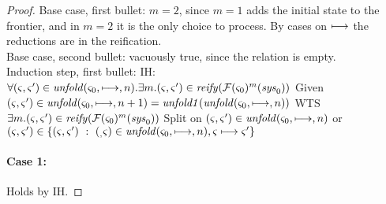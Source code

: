 \begin{proof}
  Base case, first bullet: $m = 2$, since $m = 1$ adds the initial state to the frontier, and in $m = 2$ it is the only choice to process. By cases on $\longmapsto$ the reductions are in the reification. \\
  Base case, second bullet: vacuously true, since the relation is empty. \\
  Induction step, first bullet: 
IH: $\forall (\varsigma,\varsigma') \in \mathit{unfold}(\varsigma_0,\longmapsto,n). \exists m. (\varsigma,\varsigma') \in \mathit{reify}({\mathcal F}(\varsigma_0)^m(\mathit{sys}_0))$
Given $(\varsigma,\varsigma') \in \mathit{unfold}(\varsigma_0,\longmapsto,n+1) = \mathit{unfold1}(\mathit{unfold}(\varsigma_0,\longmapsto,n))$
WTS $\exists m. (\varsigma,\varsigma') \in \mathit{reify}({\mathcal F}(\varsigma_0)^m(\mathit{sys}_0))$
Split on $(\varsigma,\varsigma') \in \mathit{unfold}(\varsigma_0,\longmapsto,n)$ or $(\varsigma,\varsigma') \in \{ (\varsigma,\varsigma')\ :\ (_,\varsigma) \in \mathit{unfold}(\varsigma_0,\longmapsto,n), \varsigma \longmapsto \varsigma'\}$
\paragraph{Case 1:} Holds by IH.

\end{proof}
